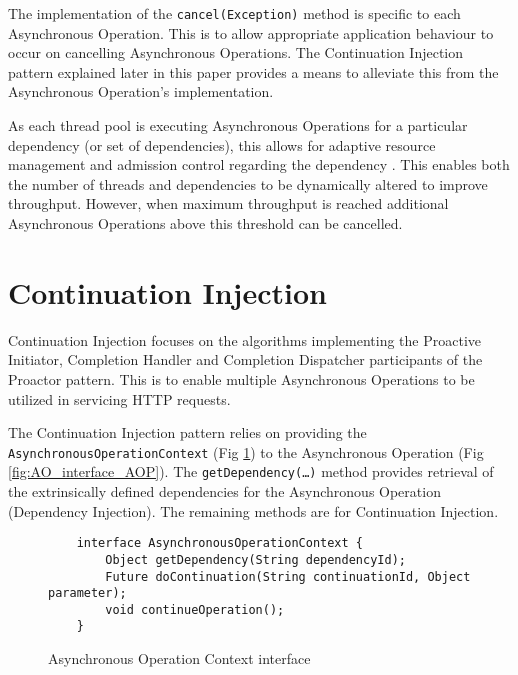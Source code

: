 \documentclass[prodmode]{style/acmlarge}
\begin{document}
The implementation of the \texttt{cancel(Exception)} method is specific to each
Asynchronous Operation.  This is to allow appropriate application behaviour to
occur on cancelling Asynchronous Operations.  The Continuation Injection pattern
explained later in this paper provides a means to alleviate this from the
Asynchronous Operation's implementation.

As each thread pool is executing Asynchronous Operations for a particular
dependency (or set of dependencies), this allows for adaptive resource
management and admission control regarding the dependency \cite{seda}.  This
enables both the number of threads and dependencies to be dynamically altered to
improve throughput.  However, when maximum throughput is reached additional
Asynchronous Operations above this threshold can be cancelled.


\section{Continuation Injection}

Continuation Injection focuses on the algorithms implementing the Proactive
Initiator, Completion Handler and Completion Dispatcher participants of the
Proactor pattern.  This is to enable multiple Asynchronous Operations to be
utilized in servicing HTTP requests.

The Continuation Injection pattern relies on providing the
\texttt{AsynchronousOperationContext} (Fig \ref{fig:AOC_interface}) to the
Asynchronous Operation (Fig \ref{fig:AO_interface_AOP}).  The
\texttt{getDependency(\ldots)} method provides retrieval of the extrinsically
defined dependencies for the Asynchronous Operation (Dependency Injection).  The
remaining methods are for Continuation Injection.

\begin{figure}[tp]
\centering
\begin{verbatim}
    interface AsynchronousOperationContext {
        Object getDependency(String dependencyId);
        Future doContinuation(String continuationId, Object parameter);
        void continueOperation();
    }
\end{verbatim}
\caption{Asynchronous Operation Context interface\footnotemark}
\label{fig:AOC_interface}
\end{figure}
\end{document}
